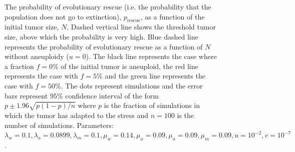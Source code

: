 \documentclass[12pt]{extarticle}
\newcommand{\presc}{p_\text{rescue}}
\begin{document}
\begin{appendices}
\begin{figure}
\caption{The probability of evolutionary rescue (i.e. the probability that the population does not go to extinction), $\presc$, as a function of the initial tumor size, $N$. Dashed vertical line shows the threshold tumor size, above which the probability is very high. Blue dashed line represents the probability of evolutionary rescue as a function of $N$ without aneuploidy ($u=0$). The black line represents the case where a fraction $f=0\%$ of the initial tumor is aneuploid, the red line represents the case with $f=5\%$ and the green line represents the case with $f=50\%$. The dots represent simulations and the error bars represent $95\%$ confidence interval of the form $p\pm1.96\sqrt{p\left(1-p\right)/n}$ where $p$ is the fraction of simulations in which the tumor has adapted to the stress and $n=100$ is the number of simulations. Parameters: $\lambda_w=0.1,\lambda_a=0.0899,\lambda_m=0.1,\mu_w=0.14,\mu_a=0.09,\mu_a=0.09,\mu_m=0.09, u=10^{-2}, v=10^{-7}$.}
\label{rescue_prob_sgv}
\end{figure}
\end{appendices}
\end{document}
